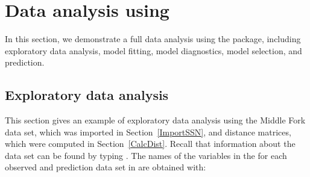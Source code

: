 \documentclass[nojss]{jss}
\begin{document}
\section[Data analysis using SSN]{Data analysis using } \label{dataAnaSSN}

In this section, we demonstrate a full data analysis using the
 package, including exploratory data analysis, model fitting,
model diagnostics, model selection, and prediction.


\subsection{Exploratory data analysis}

This section gives an example of exploratory data analysis using the
Middle Fork data set, which was imported in Section~\ref{ImportSSN},
and distance matrices, which were computed in
Section~\ref{CalcDist}. Recall that information about the data set can
be found by typing . The names of the
variables in the   for each observed
and prediction data set in  are obtained with:
\end{document}
